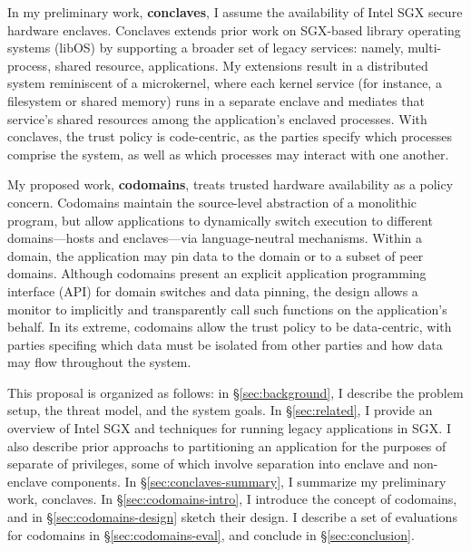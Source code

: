 %
In my preliminary work, \textbf{conclaves}, I assume the availability of Intel
SGX secure hardware enclaves.
%
Conclaves extends prior work on SGX-based library operating systems (libOS) by
supporting a broader set of legacy services: namely, multi-process, shared
resource, applications.
%
My extensions result in a distributed system reminiscent of a microkernel,
where each kernel service (for instance, a filesystem or shared memory)
runs in a separate enclave and mediates that service’s shared resources
among the application's enclaved processes.
%
With conclaves, the trust policy is code-centric, as the parties specify which
processes comprise the system, as well as which processes may interact with one
another.


My proposed work, \textbf{codomains}, treats trusted hardware availability as a
policy concern.
%
Codomains maintain the source-level abstraction of a monolithic program, but
allow applications to dynamically switch execution to different domains---hosts
and enclaves---via language-neutral mechanisms.
%
Within a domain, the application may pin data to the domain or to a subset of
peer domains.
%
Although codomains present an explicit application programming interface (API)
for domain switches and data pinning, the design allows a monitor to implicitly
and transparently call such functions on the application's behalf.
%
In its extreme, codomains allow the trust policy to be data-centric, with parties
specifing which data must be isolated from other parties and how data may flow
throughout the system.


This proposal is organized as follows: in \S\ref{sec:background}, I describe
the problem setup, the threat model, and the system goals.
%
In \S\ref{sec:related}, I provide an overview of Intel SGX  and techniques for
running legacy applications in SGX\@.
%
I also describe prior approachs to partitioning an application for the
purposes of separate of privileges, some of which involve separation
into enclave and non-enclave components.
%
In \S\ref{sec:conclaves-summary}, I summarize my preliminary work, conclaves.
%
In \S\ref{sec:codomains-intro}, I introduce the concept of codomains, and in
\S\ref{sec:codomains-design} sketch their design.
%
I describe a set of evaluations for codomains in \S\ref{sec:codomains-eval},
and conclude in \S\ref{sec:conclusion}.
